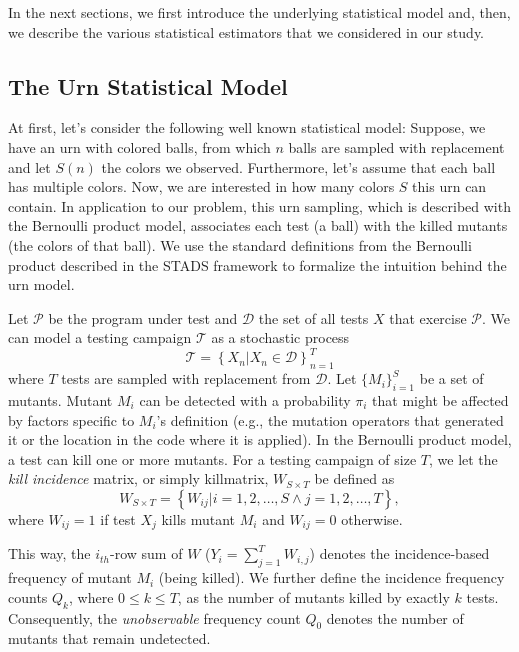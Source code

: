 \documentclass[sigconf,review,anonymous]{acmart}
\begin{document}
In the next sections, we first introduce the underlying statistical model and, then,
we describe the various statistical estimators that we considered in our study.

\subsection{The Urn Statistical Model}
At first, let's consider the following well known statistical model:
Suppose, we have an urn with colored balls, from which $n$ balls are
sampled with replacement and let $S(n)$ the colors we observed.
%
Furthermore, let's assume that each ball has multiple colors.
Now, we are interested in how many colors $S$ this urn can contain.
In application to our problem, this urn sampling, which is described with the Bernoulli product model, associates each test (a ball) with the killed mutants (the colors of that ball). %
%
We use the standard definitions from the Bernoulli product described in the STADS framework
to formalize the intuition behind the urn model.

Let $\mathcal{P}$ be the program under test and $\mathcal{D}$ the set of all tests $X$ that exercise $\mathcal{P}$.
We can model a testing campaign $\mathcal{T}$ 
as a stochastic process
\[
    \mathcal{T}=\left\{ X_n|X_n \in \mathcal{D} \right\}_{n=1}^T
\]
where $T$ tests are sampled with replacement from $\mathcal{D}$.
Let $\{M_i\}_{i=1}^S$ be a set of mutants.
Mutant ${M_i}$ can be detected with a probability $\pi_i$ that
might be affected by factors specific to ${M_i}$'s definition (e.g.,
the mutation operators that generated it or the location in the code where it is applied).
%
In the Bernoulli product model, a test can kill one or more mutants.
For a testing campaign of size $T$, %
we let the \emph{kill incidence} matrix, or simply killmatrix, $W_{S\times T}$ be defined as
\[
    W_{S\times T} = \left\{W_{ij} |i=1,2,\dots,S\land j=1,2,\dots,T \right\},
\]
where $W_{ij} = 1$ if test $X_j$ kills mutant $M_i$ and $W_{ij} = 0$ otherwise.

This way, the $i_{th}$-row sum of $W$ ($Y_i=\sum_{j=1}^{T}W_{i,j}$) denotes the
incidence-based frequency of mutant $M_i$ (being killed).
We further define the incidence frequency counts $Q_k$, where $0 \leq k \leq T$, as the number of mutants killed by exactly $k$ tests.
Consequently, the \emph{unobservable} frequency count $Q_0$
denotes the number of mutants that remain undetected.
\end{document}
